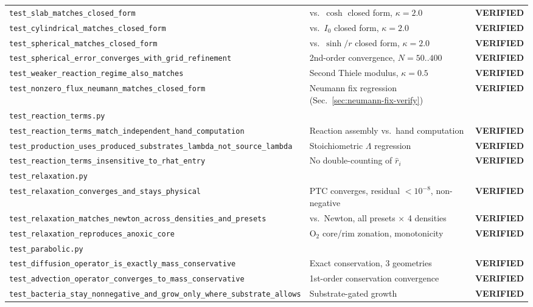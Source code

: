 \documentclass[11pt]{article}
\newcommand{\verified}{\textcolor{green!45!black}{\textbf{VERIFIED}}}
\newcommand{\code}[1]{\texttt{#1}}
\newcommand{\test}[1]{\texttt{\small #1}}
\begin{document}
\begin{longtable}{p{3.6cm}p{9.4cm}c}
\test{test\_slab\_matches\_closed\_form} & vs.\ $\cosh$ closed form, $\kappa{=}2.0$ & \verified \\
\test{test\_cylindrical\_matches\_closed\_form} & vs.\ $I_0$ closed form, $\kappa{=}2.0$ & \verified \\
\test{test\_spherical\_matches\_closed\_form} & vs.\ $\sinh/r$ closed form, $\kappa{=}2.0$ & \verified \\
\test{test\_spherical\_error\_converges\_with\_grid\_refinement} & 2nd-order convergence, $N{=}50..400$ & \verified \\
\test{test\_weaker\_reaction\_regime\_also\_matches} & Second Thiele modulus, $\kappa{=}0.5$ & \verified \\
\test{test\_nonzero\_flux\_neumann\_matches\_closed\_form} & Neumann fix regression (Sec.~\ref{sec:neumann-fix-verify}) & \verified \\
\midrule
\multicolumn{3}{l}{\code{test\_reaction\_terms.py}} \\
\test{test\_reaction\_terms\_match\_independent\_hand\_computation} & Reaction assembly vs.\ hand computation & \verified \\
\test{test\_production\_uses\_produced\_substrates\_lambda\_not\_source\_lambda} & Stoichiometric $\Lambda$ regression & \verified \\
\test{test\_reaction\_terms\_insensitive\_to\_rhat\_entry} & No double-counting of $\hat r_i$ & \verified \\
\midrule
\multicolumn{3}{l}{\code{test\_relaxation.py}} \\
\test{test\_relaxation\_converges\_and\_stays\_physical} & PTC converges, residual $<10^{-8}$, non-negative & \verified \\
\test{test\_relaxation\_matches\_newton\_across\_densities\_and\_presets} & vs.\ Newton, all presets $\times$ 4 densities & \verified \\
\test{test\_relaxation\_reproduces\_anoxic\_core} & O$_2$ core/rim zonation, monotonicity & \verified \\
\midrule
\multicolumn{3}{l}{\code{test\_parabolic.py}} \\
\test{test\_diffusion\_operator\_is\_exactly\_mass\_conservative} & Exact conservation, 3 geometries & \verified \\
\test{test\_advection\_operator\_converges\_to\_mass\_conservative} & 1st-order conservation convergence & \verified \\
\test{test\_bacteria\_stay\_nonnegative\_and\_grow\_only\_where\_substrate\_allows} & Substrate-gated growth & \verified \\

\end{longtable}
\end{document}
